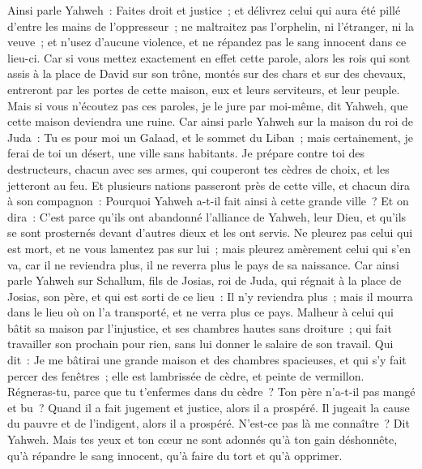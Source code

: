 \begin{multicols}{2}
Ainsi parle Yahweh~: Faites droit et justice~; et délivrez celui qui aura été pillé d'entre les mains de l'oppresseur~; ne maltraitez pas l'orphelin, ni l'étranger, ni la veuve~; et n'usez d'aucune violence, et ne répandez pas le sang innocent dans ce lieu-ci.
Car si vous mettez exactement en effet cette parole, alors les rois qui sont assis à la place de David sur son trône, montés sur des chars et sur des chevaux, entreront par les portes de cette maison, eux et leurs serviteurs, et leur peuple.
Mais si vous n'écoutez pas ces paroles, je le jure par moi-même, dit Yahweh, que cette maison deviendra une ruine.
Car ainsi parle Yahweh sur la maison du roi de Juda~: Tu es pour moi un Galaad, et le sommet du Liban~; mais certainement, je ferai de toi un désert, une ville sans habitants.
Je prépare contre toi des destructeurs, chacun avec ses armes, qui couperont tes cèdres de choix, et les jetteront au feu.
Et plusieurs nations passeront près de cette ville, et chacun dira à son compagnon~: Pourquoi Yahweh a-t-il fait ainsi à cette grande ville~?
Et on dira~: C'est parce qu'ils ont abandonné l'alliance de Yahweh, leur Dieu, et qu'ils se sont prosternés devant d'autres dieux et les ont servis.
Ne pleurez pas celui qui est mort, et ne vous lamentez pas sur lui~; mais pleurez amèrement celui qui s'en va, car il ne reviendra plus, il ne reverra plus le pays de sa naissance.
Car ainsi parle Yahweh sur Schallum, fils de Josias, roi de Juda, qui régnait à la place de Josias, son père, et qui est sorti de ce lieu~: Il n'y reviendra plus~;
mais il mourra dans le lieu où on l'a transporté, et ne verra plus ce pays.
Malheur à celui qui bâtit sa maison par l'injustice, et ses chambres hautes sans droiture~; qui fait travailler son prochain pour rien, sans lui donner le salaire de son travail.
Qui dit~: Je me bâtirai une grande maison et des chambres spacieuses, et qui s'y fait percer des fenêtres~; elle est lambrissée de cèdre, et peinte de vermillon.
Régneras-tu, parce que tu t'enfermes dans du cèdre~? Ton père n'a-t-il pas mangé et bu~? Quand il a fait jugement et justice, alors il a prospéré.
Il jugeait la cause du pauvre et de l'indigent, alors il a prospéré. N'est-ce pas là me connaître~? Dit Yahweh.
Mais tes yeux et ton cœur ne sont adonnés qu'à ton gain déshonnête, qu'à répandre le sang innocent, qu'à faire du tort et qu'à opprimer.

\end{multicols}
